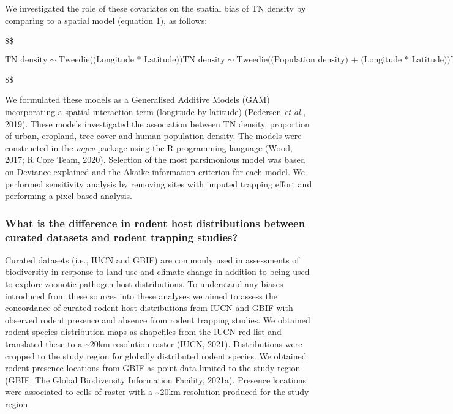 \documentclass[
]{article}
\begin{document}
We investigated the role of these covariates on the spatial bias of TN
density by comparing to a spatial model (equation 1), as follows:

\$\$

\begin{equation}
\tag{1}
\text{TN density} \sim \text{Tweedie((Longitude * Latitude))}

\tag{2}
\text{TN density} \sim \text{Tweedie((Population density) + (Longitude * Latitude))}

\tag{3}
\text{TN density} \sim \text{Tweedie((Population density) + (Region area) + (Longitude * Latitude))}

\text{TN density} \sim \text{Tweedie((Proportion cropland) + (Proportion tree cover) + (Proportion urban) + (Longitude * Latitude))}

\tag{5}
\text{TN density} \sim \text{Tweedie((Population density) + (Region area) + (Proportion urban) + (Longitude * Latitude))}
\end{equation}

\$\$

We formulated these models as a Generalised Additive Models (GAM)
incorporating a spatial interaction term (longitude by latitude)
(Pedersen \emph{et al.}, 2019). These models investigated the
association between TN density, proportion of urban, cropland, tree
cover and human population density. The models were constructed in the
\emph{mgcv} package using the R programming language (Wood, 2017; R Core
Team, 2020). Selection of the most parsimonious model was based on
Deviance explained and the Akaike information criterion for each model.
We performed sensitivity analysis by removing sites with imputed
trapping effort and performing a pixel-based analysis.

\hypertarget{what-is-the-difference-in-rodent-host-distributions-between-curated-datasets-and-rodent-trapping-studies}{%
\subsubsection{What is the difference in rodent host distributions
between curated datasets and rodent trapping
studies?}\label{what-is-the-difference-in-rodent-host-distributions-between-curated-datasets-and-rodent-trapping-studies}}

Curated datasets (i.e., IUCN and GBIF) are commonly used in assessments
of biodiversity in response to land use and climate change in addition
to being used to explore zoonotic pathogen host distributions. To
understand any biases introduced from these sources into these analyses
we aimed to assess the concordance of curated rodent host distributions
from IUCN and GBIF with observed rodent presence and absence from rodent
trapping studies. We obtained rodent species distribution maps as
shapefiles from the IUCN red list and translated these to a
\textasciitilde20km resolution raster (IUCN, 2021). Distributions were
cropped to the study region for globally distributed rodent species. We
obtained rodent presence locations from GBIF as point data limited to
the study region (GBIF: The Global Biodiversity Information Facility,
2021a). Presence locations were associated to cells of raster with a
\textasciitilde20km resolution produced for the study region.
\end{document}
